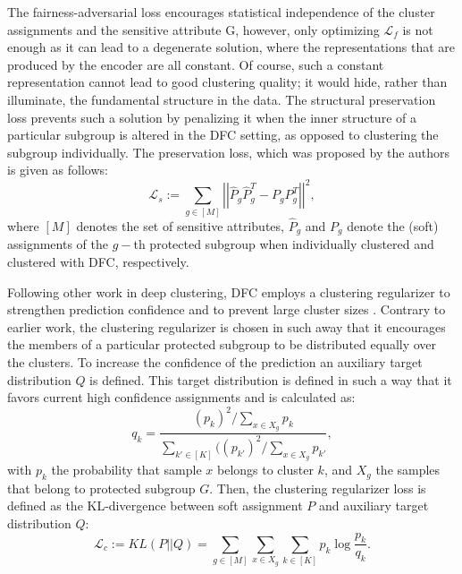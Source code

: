 The fairness-adversarial loss encourages statistical independence of the cluster assignments and the sensitive attribute G, however, only optimizing $\mathcal{L}_f$ is not enough as it can lead to a degenerate solution, where the representations that are produced by the encoder are all constant. Of course, such a constant representation cannot lead to good clustering quality; it would hide, rather than illuminate, the fundamental structure in the data. The structural preservation loss prevents such a solution by penalizing it when the inner structure of a particular subgroup is altered in the DFC setting, as opposed to clustering the subgroup individually. The preservation loss, which was proposed by the authors \citep{Li_2020_CVPR} is given as follows:
\begin{equation}
    \mathcal{L}_s := \sum_{g\in[M]}\left|\left|\hat{P}_g\hat{P}_g^T-P_g P_g^T\right|\right|^2,
\end{equation}
where $[M]$ denotes the  set of sensitive attributes, $\hat{P}_g$ and $P_g$ denote the (soft) assignments of the $g-$th protected subgroup when individually clustered and clustered with DFC, respectively. 

Following other work in deep clustering, DFC employs a clustering regularizer to strengthen prediction confidence and to prevent large cluster sizes \citep{Li_2020_CVPR}. Contrary to earlier work, the clustering regularizer is chosen in such away that it encourages the members of a particular protected subgroup to be distributed equally over the clusters. To increase the confidence of the prediction an auxiliary target distribution $Q$ is defined. This target distribution is defined in such a way that it favors current high confidence assignments and is calculated as:
\begin{equation}
    q_k = \frac{(p_k)^2/\sum_{x\in X_g} p_k}{\sum_{k'\in [K]} ((p_{k'})^2/\sum_{x\in X_g} p_{k'}},
    \label{eq:qk}
\end{equation}
with $p_k$ the probability that sample $x$ belongs to cluster $k$, and $X_g$ the samples that belong to protected subgroup $G$. Then, the clustering regularizer loss is defined as the KL-divergence between soft assignment $P$ and auxiliary target distribution $Q$:
\begin{equation}
    \mathcal{L}_c:= KL(P||Q)=\sum_{g\in [M]}\sum_{x\in X_g}\sum_{k\in[K]}p_k \log \frac{p_k}{q_k}.
    \label{eq:KL}
\end{equation}

